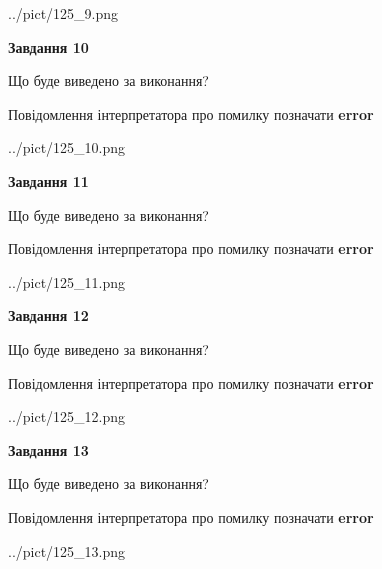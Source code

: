 \documentclass[11pt, ukrainian]{article}
\begin{document}
{\begin {large}
\begin{center}
	{../pict/125_9.png}
\end{center}
\newpage

{\begin {center}\textbf{Завдання 10}\end {center}}\par
Що буде виведено за виконання? \par
Повідомлення інтерпретатора про помилку позначати \textbf{error}

\begin{center}
	{../pict/125_10.png}
\end{center}
\newpage

{\begin {center}\textbf{Завдання 11}\end {center}}\par
Що буде виведено за виконання? \par
Повідомлення інтерпретатора про помилку позначати \textbf{error}

\begin{center}
	{../pict/125_11.png}
\end{center}
\newpage

{\begin {center}\textbf{Завдання 12}\end {center}}\par
Що буде виведено за виконання? \par
Повідомлення інтерпретатора про помилку позначати \textbf{error}

\begin{center}
	{../pict/125_12.png}
\end{center}
\newpage

{\begin {center}\textbf{Завдання 13}\end {center}}\par
Що буде виведено за виконання? \par
Повідомлення інтерпретатора про помилку позначати \textbf{error}

\begin{center}
	{../pict/125_13.png}
\end{center}
\newpage


\end{large}}
\end{document}
